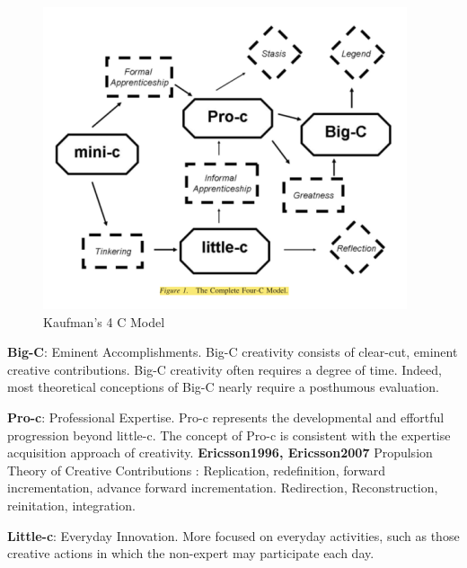 \begin{figure}[htb] %
  \centering
  \includegraphics[width=\linewidth]{images/4C.png}
\caption[Kaufman's 4 C Model]{Kaufman's 4 C Model}
\label{fig:4C}
\end{figure}

\citep{Kaufman2009}

\textbf{Big-C}: Eminent Accomplishments. Big-C creativity consists of clear-cut, eminent creative contributions. Big-C creativity often requires a degree of time. Indeed, most theoretical conceptions of Big-C nearly require a posthumous evaluation.

\textbf{Pro-c}: Professional Expertise. Pro-c represents the developmental and effortful progression beyond little-c. The concept of Pro-c is consistent with the expertise acquisition approach of creativity. \textbf{Ericsson1996, Ericsson2007} Propulsion Theory of Creative Contributions \citep{Sternberg1999, Sternberg2006}: Replication, redefinition, forward incrementation, advance forward incrementation. Redirection, Reconstruction, reinitation, integration.

\textbf{Little-c}: Everyday Innovation. More focused on everyday activities, such as those creative actions in which the non-expert may participate each day.

